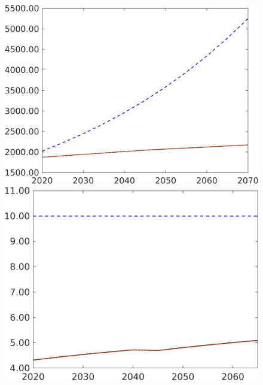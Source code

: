 \begin{figure}[h!!]
\begin{minipage}[]{0.32\textwidth}
\end{minipage}
\begin{minipage}[]{0.32\textwidth}
	\includegraphics[width=1\textwidth]{../../codding_model/own_basedOnFried/optimalPol_190722_tidiedUp/figures/all_10Aout22/CountMod1_target_Af_regime3_spillover0_sep1_extern0_PV1_etaa0.79_lgd0.png}
\end{minipage}
\begin{minipage}[]{0.32\textwidth}
	\includegraphics[width=1\textwidth]{../../codding_model/own_basedOnFried/optimalPol_190722_tidiedUp/figures/all_10Aout22/CountMod1_target_gAagg_regime3_spillover0_sep1_extern0_PV1_etaa0.79_lgd0.png}
\end{minipage}
\end{figure}

